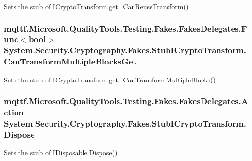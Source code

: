 Sets the stub of I\-Crypto\-Transform.\-get\-\_\-\-Can\-Reuse\-Transform()

\hypertarget{class_system_1_1_security_1_1_cryptography_1_1_fakes_1_1_stub_i_crypto_transform_a1327b80fbc2d8cf6d233da1205f1c817}{
\subsubsection[{Can\-Transform\-Multiple\-Blocks\-Get}]{\setlength{\rightskip}{0pt plus 5cm}mqttf.\-Microsoft.\-Quality\-Tools.\-Testing.\-Fakes.\-Fakes\-Delegates.\-Func$<$bool$>$ System.\-Security.\-Cryptography.\-Fakes.\-Stub\-I\-Crypto\-Transform.\-Can\-Transform\-Multiple\-Blocks\-Get}}\label{class_system_1_1_security_1_1_cryptography_1_1_fakes_1_1_stub_i_crypto_transform_a1327b80fbc2d8cf6d233da1205f1c817}


Sets the stub of I\-Crypto\-Transform.\-get\-\_\-\-Can\-Transform\-Multiple\-Blocks()

\hypertarget{class_system_1_1_security_1_1_cryptography_1_1_fakes_1_1_stub_i_crypto_transform_a889065305f5e6d655a599359f998aefb}{
\subsubsection[{Dispose}]{\setlength{\rightskip}{0pt plus 5cm}mqttf.\-Microsoft.\-Quality\-Tools.\-Testing.\-Fakes.\-Fakes\-Delegates.\-Action System.\-Security.\-Cryptography.\-Fakes.\-Stub\-I\-Crypto\-Transform.\-Dispose}}\label{class_system_1_1_security_1_1_cryptography_1_1_fakes_1_1_stub_i_crypto_transform_a889065305f5e6d655a599359f998aefb}


Sets the stub of I\-Disposable.\-Dispose()


